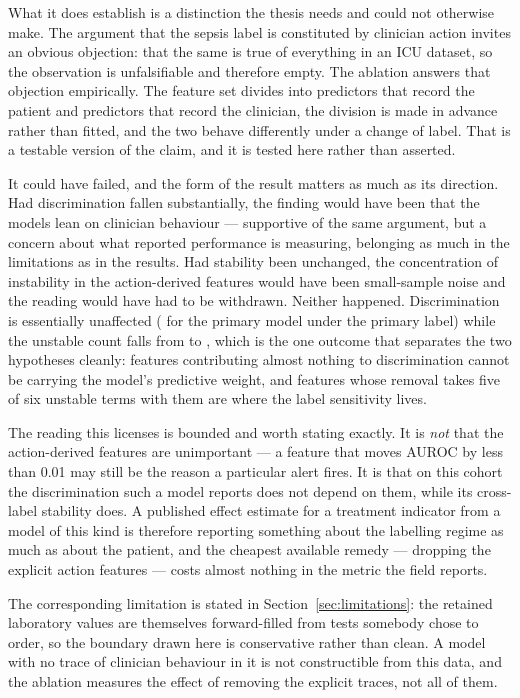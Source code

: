What it does establish is a distinction the thesis needs and could not
otherwise make. The argument that the sepsis label is constituted by clinician
action invites an obvious objection: that the same is true of everything in an
ICU dataset, so the observation is unfalsifiable and therefore empty. The
ablation answers that objection empirically. The feature set divides into
predictors that record the patient and predictors that record the clinician,
the division is made in advance rather than fitted, and the two behave
differently under a change of label. That is a testable version of the claim,
and it is tested here rather than asserted.

It could have failed, and the form of the result matters as much as its
direction. Had discrimination fallen substantially, the finding would have been
that the models lean on clinician behaviour --- supportive of the same argument,
but a concern about what reported performance is measuring, belonging as much in
the limitations as in the results. Had stability been unchanged, the
concentration of instability in the action-derived features would have been
small-sample noise and the reading would have had to be withdrawn. Neither
happened. Discrimination is essentially unaffected
(\pcAblDeltaAurocPrimaryB{} for the primary model under the primary label) while
the unstable count falls from \pcHTwoEst{} to \pcAblHTwoNUnstable, which is the
one outcome that separates the two hypotheses cleanly: features contributing
almost nothing to discrimination cannot be carrying the model's predictive
weight, and features whose removal takes five of six unstable terms with them
are where the label sensitivity lives.

The reading this licenses is bounded and worth stating exactly. It is
\emph{not} that the action-derived features are unimportant --- a feature that
moves AUROC by less than 0.01 may still be the reason a particular alert fires.
It is that on this cohort the discrimination such a model reports does not
depend on them, while its cross-label stability does. A published effect
estimate for a treatment indicator from a model of this kind is therefore
reporting something about the labelling regime as much as about the patient, and
the cheapest available remedy --- dropping the explicit action features --- costs
almost nothing in the metric the field reports.

The corresponding limitation is stated in Section~\ref{sec:limitations}: the
retained laboratory values are themselves forward-filled from tests somebody
chose to order, so the boundary drawn here is conservative rather than clean. A
model with no trace of clinician behaviour in it is not constructible from this
data, and the ablation measures the effect of removing the explicit traces, not
all of them.


